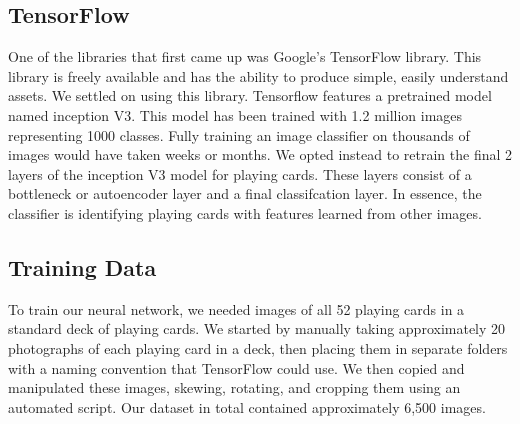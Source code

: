 \documentclass[letterpaper]{article}
\begin{document}
\subsection{TensorFlow}
One of the libraries that first came up was Google's TensorFlow library.  This library is freely available and has the ability to produce simple, easily understand assets.  We settled on using this library.
Tensorflow features a pretrained model named inception V3.  This model has been trained with 1.2 million images representing 1000 classes.  Fully training an image classifier on thousands of images would have taken weeks or months.  We opted instead to retrain the final 2 layers of the inception V3 model for playing cards.  These layers consist of a bottleneck or autoencoder layer and a final classifcation layer.  In essence, the classifier is identifying playing cards with features learned from other images. 

\subsection{Training Data}
To train our neural network, we needed images of all 52 playing cards in a standard deck of playing cards.  We started by manually taking approximately 20 photographs of each playing card in a deck, then placing them in separate folders with a naming convention that TensorFlow could use.  We then copied and manipulated these images, skewing, rotating, and cropping them using an automated script. Our dataset in total contained approximately 6,500 images.
\end{document}
